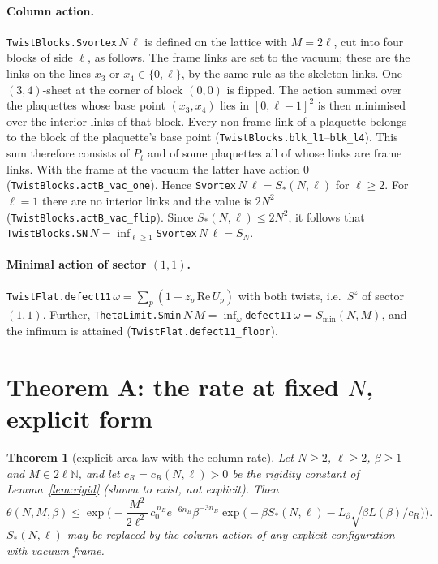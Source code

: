 \documentclass[11pt,a4paper]{article}
\newtheorem{theorem}{Theorem}
\theoremstyle{definition}
\theoremstyle{remark}
\newcommand{\code}[1]{\texttt{#1}}
\begin{document}
\paragraph{Column action.}
\code{TwistBlocks.Svortex}$\,N\,\ell$ is defined on the lattice with $M=2\ell$, cut into four blocks of side $\ell$, as follows.
The frame links are set to the vacuum; these are the links on the lines $x_3$ or $x_4\in\{0,\ell\}$, by the same rule as the skeleton links.
One $(3,4)$-sheet at the corner of block $(0,0)$ is flipped.
The action summed over the plaquettes whose base point $(x_3,x_4)$ lies in $[0,\ell-1]^2$ is then minimised over the interior links of that block.
Every non-frame link of a plaquette belongs to the block of the plaquette's base point (\code{TwistBlocks.blk\_l1}--\code{blk\_l4}).
This sum therefore consists of $P_t$ and of some plaquettes all of whose links are frame links.
With the frame at the vacuum the latter have action $0$ (\code{TwistBlocks.actB\_vac\_one}). Hence \code{Svortex}$\,N\,\ell=S_*(N,\ell)$ for $\ell\ge2$.
For $\ell=1$ there are no interior links and the value is $2N^2$ (\code{TwistBlocks.actB\_vac\_flip}).
Since $S_*(N,\ell)\le2N^2$, it follows that \code{TwistBlocks.SN}$\,N=\inf_{\ell\ge1}$\code{Svortex}$\,N\,\ell=S_N$.

\paragraph{Minimal action of sector $(1,1)$.}
\code{TwistFlat.defect11}$\,\omega=\sum_p(1-z_p\,\mathrm{Re}\,U_p)$ with both twists, i.e.\ $S^z$ of sector $(1,1)$.
Further, \code{ThetaLimit.Smin}$\,N\,M=\inf_\omega$\code{defect11}$\,\omega=S_{\min}(N,M)$, and the infimum is attained (\code{TwistFlat.defect11\_floor}).

\section{Theorem A: the rate at fixed $N$, explicit form}\label{sec:A}

\begin{theorem}[explicit area law with the column rate]\label{thm:A}
Let $N\ge2$, $\ell\ge2$, $\beta\ge1$ and $M\in2\ell\mathbb{N}$, and let $c_R=c_R(N,\ell)>0$ be the rigidity constant of Lemma~\ref{lem:rigid} (shown to exist, not explicit). Then
\[ \theta(N,M,\beta)\le\exp\Big(-\frac{M^2}{2\ell^2}\,c_0^{\,n_B}e^{-6n_B}\beta^{-3n_B}\exp\big(-\beta S_*(N,\ell)-L_\partial\sqrt{\beta L(\beta)/c_R}\big)\Big). \]
$S_*(N,\ell)$ may be replaced by the column action of any explicit configuration with vacuum frame.
\end{theorem}
\end{document}
